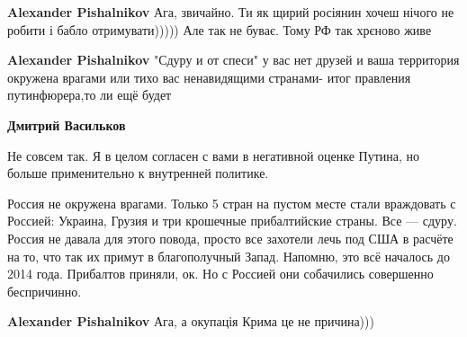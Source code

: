 \begin{itemize}
\begin{itemize}
 
\textbf{Alexander Pishalnikov} Ага, звичайно. Ти як щирий росіянин хочеш нічого не робити і бабло отримувати))))) Але так не буває. Тому РФ так хрєново живе

 
\textbf{Alexander Pishalnikov} "Сдуру и от спеси" у вас нет друзей и ваша территория окружена врагами или тихо вас ненавидящими странами- итог правления путинфюрера,то ли ещё будет

 
\textbf{Дмитрий Васильков} 

Не совсем так. Я в целом согласен с вами в негативной оценке Путина, но больше применительно к внутренней политике.

Россия не окружена врагами. Только 5 стран на пустом месте стали враждовать с
Россией: Украина, Грузия и три крошечные прибалтийские страны. Все — сдуру.
Россия не давала для этого повода, просто все захотели лечь под США в расчёте
на то, что так их примут в благополучный Запад. Напомню, это всё началось до
2014 года. Прибалтов приняли, ок. Но с Россией они собачились совершенно
беспричинно.


 
\textbf{Alexander Pishalnikov} Ага, а окупація Крима це не причина)))

 

\end{itemize}
\end{itemize}
